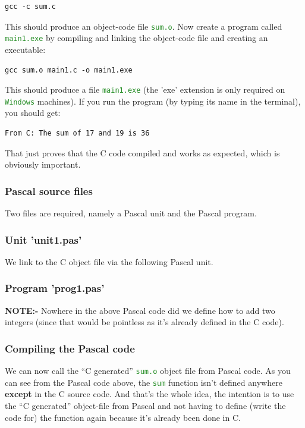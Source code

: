 \documentclass[10pt,a4paper]{article}
\newcommand{\mytext}[1]{\textcolor{ForestGreen}{\texttt{#1}}}
\begin{document}
\lstset{style=myBash}
\begin{lstlisting}
gcc -c sum.c
\end{lstlisting}

This should produce an object-code file \mytext{sum.o}. Now create a
program called \mytext{main1.exe} by compiling and linking the
object-code file and creating an executable:

\lstset{style=myBash}
\begin{lstlisting}
gcc sum.o main1.c -o main1.exe
\end{lstlisting}

This should produce a file \mytext{main1.exe} (the 'exe' extension is only required on \mytext{Windows} machines). If you run the program
(by typing its name in the terminal), you should get:

\lstset{style=myBash}
\begin{lstlisting}
From C: The sum of 17 and 19 is 36
\end{lstlisting}
That just proves that the C code compiled and works as expected, which is
obviously important.
\clearpage


\subsubsection{Pascal source files}
Two files are required, namely a Pascal unit and the Pascal program.
\lstset{style=myPascal}

\subsubsection*{Unit 'unit1.pas'}
We link to the C object file via the following Pascal unit.


\subsubsection*{Program 'prog1.pas'}


\textbf{NOTE:-} Nowhere in the above Pascal code did we define how to add two integers (since that would be pointless as it's already defined in the C code).
\clearpage

\subsubsection*{Compiling the Pascal code}
We can now call the ``C generated'' \mytext{sum.o} object file from Pascal code. As you can see from the Pascal code above, the \mytext{sum} function isn't defined anywhere \textbf{except} in the C source code. And that's the whole idea, the intention is to use the ``C generated'' object-file from Pascal and not having to define (write the code for) the function again because it's already been done in C.
\end{document}

